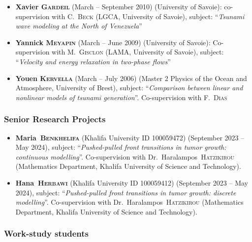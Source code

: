 \documentclass[final, a4paper, oneside, 12pt]{article}
\numberwithin{equation}{section}
\begin{document}
\begin{itemize}
  \item \textbf{Xavier \textsc{Gardeil}} (March -- September 2010) (University of Savoie): co-supervision with C.~\textsc{Beck} (LGCA, University of Savoie), subject: ``\textit{Tsunami wave modeling at the North of Venezuela}''
  
  \item \textbf{Yannick \textsc{Meyapin}} (March -- June 2009) (University of Savoie): Co-supervision with M.~\textsc{Gisclon} (LAMA, University of Savoie), subject: ``\textit{Velocity and energy relaxation in two-phase flows}''
  
  \item \textbf{Youen \textsc{Kervella}} (March -- July 2006) (Master 2 Physics of the Ocean and Atmosphere, University of Brest), subject: ``\textit{Comparison between linear and nonlinear models of tsunami generation}''. Co-supervision with F.~\textsc{Dias}
  
\end{itemize}

\subsubsection{Senior Research Projects}

\begin{itemize}

    \item \textbf{Maria~\textsc{Benkhelifa}} (Khalifa University ID 100059472) (September 2023 -- May 2024), subject: ``\textit{Pushed-pulled front transitions in tumor growth: continuous modelling}''. Co-supervision with Dr.~Haralampos~\textsc{Hatzikirou} (Mathematics Department, Khalifa University of Science and Technology).

    \item \textbf{Hana~\textsc{Herbawi}} (Khalifa University ID 100059412) (September 2023 -- May 2024), subject: ``\textit{Pushed-pulled front transitions in tumor growth: discrete modelling}''. Co-supervision with Dr.~Haralampos~\textsc{Hatzikirou} (Mathematics Department, Khalifa University of Science and Technology).
    
\end{itemize}

\subsubsection{Work-study students}
\end{document}
